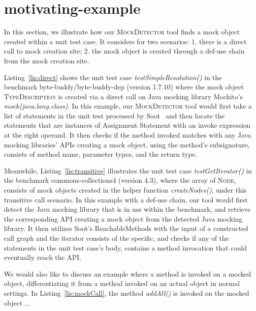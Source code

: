 \section{motivating-example}
\label{sec:motivating-example}

In this section, we illustrate how our \textsc{MockDetector} tool finds a mock object created within a unit test case. It considers for two scenarios: 1. there is a direct call to mock creation site; 2. the mock object is created through a def-use chain from the mock creation site.

Listing~\ref{lis:direct} shows the unit test case \textit{testSimpleResolution()} in the benchmark byte-buddy/byte-buddy-dep (version 1.7.10) where the mock object \textsc{TypeDescription} is created via a direct call on Java mocking library Mockito's \textit{mock(java.lang.class)}. In this example, our \textsc{MockDetector} tool would first take a list of statements in the unit test processed by Soot~\cite{Vallee-Rai:1999:SJB:781995.782008} and then locate the statements that are instances of Assignment Statement with an invoke expression at the right operand. It then checks if the method invoked matches with any Java mocking libraries' APIs creating a mock object, using the method's subsignature, consists of method name, parameter types, and the return type.

Meanwhile, Listing~\ref{lis:transitive} illustrates the unit test case \textit{testGetIterator()} in the benchmark commons-collections4 (version 4.3), where the array of \textsc{Node}, consists of mock objects created in the helper function \textit{createNodes()}, under this transitive call scenario. In this example with a def-use chain, our tool would first detect the Java mocking library that is in use within the benchmark, and retrieve the corresponding API creating a mock object from the detected Java mocking library. It then utilizes Soot's ReachableMethods with the input of a constructed call graph and the iterator consists of the specific, and checks if any of the statements in the unit test case's body, contains a method invocation that could eventually reach the API. 
 
We would also like to discuss an example where a method is invoked on a mocked object, differentiating it from a method invoked on an actual object in normal settings. In Listing~\ref{lis:mockCall}, the method \textit{addAll()} is invoked on the mocked object ...

‎

